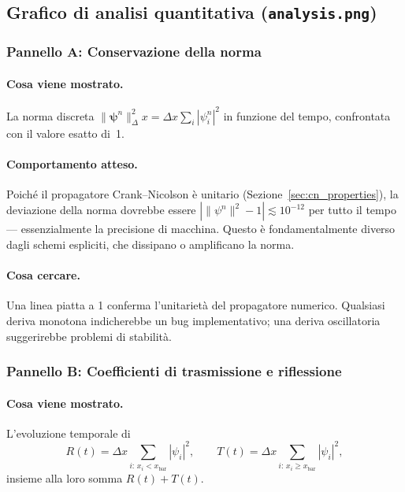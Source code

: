 \documentclass[12pt, a4paper]{article}
\newcommand{\dx}{\Delta x}
\newcommand{\CN}{Crank--Nicolson}
\begin{document}
\subsection{Grafico di analisi quantitativa (\texttt{analysis.png})}

\subsubsection{Pannello A: Conservazione della norma}

\paragraph{Cosa viene mostrato.}
La norma discreta $\|\boldsymbol{\psi}^n\|^2_\dx = \dx\sum_i |\psi_i^n|^2$
in funzione del tempo, confrontata con il valore esatto di~1.

\paragraph{Comportamento atteso.}
Poiché il propagatore \CN{} è unitario
(Sezione~\ref{sec:cn_properties}), la deviazione della norma dovrebbe
essere $|\|\psi^n\|^2 - 1| \lesssim 10^{-12}$ per tutto il tempo ---
essenzialmente la precisione di macchina.  Questo è fondamentalmente
diverso dagli schemi espliciti, che dissipano o amplificano la norma.

\paragraph{Cosa cercare.}
Una linea piatta a 1 conferma l'unitarietà del propagatore numerico.
Qualsiasi deriva monotona indicherebbe un bug implementativo; una
deriva oscillatoria suggerirebbe problemi di stabilità.

\subsubsection{Pannello B: Coefficienti di trasmissione e riflessione}

\paragraph{Cosa viene mostrato.}
L'evoluzione temporale di
\begin{equation}
  R(t) = \dx\sum_{i:\,x_i < x_\text{bar}} |\psi_i|^2,
  \qquad
  T(t) = \dx\sum_{i:\,x_i \geq x_\text{bar}} |\psi_i|^2,
\end{equation}
insieme alla loro somma $R(t) + T(t)$.
\end{document}
